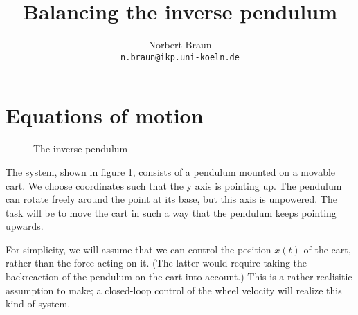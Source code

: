 \documentclass[a4paper]{article}
\title{Balancing the inverse pendulum}
\author{Norbert Braun\\\texttt{n.braun@ikp.uni-koeln.de}}
\begin{document}
\maketitle
\section{Equations of motion}
\begin{figure}
\centering


\caption{The inverse pendulum}
\label{fig:system}
\end{figure}

The system, shown in figure \ref{fig:system}, consists of a pendulum mounted on a movable cart. We choose coordinates such that the y axis is pointing up. The pendulum can rotate freely around the point at its base, but this axis is unpowered. The task will be to move the cart in such a way that the pendulum keeps pointing upwards.

For simplicity, we will assume that we can control the position $x(t)$ of the cart, rather than the force acting on it. (The latter would require taking the backreaction of the pendulum on the cart into account.) This is a rather realisitic assumption to make; a closed-loop control of the wheel velocity will realize this kind of system.
\end{document}
